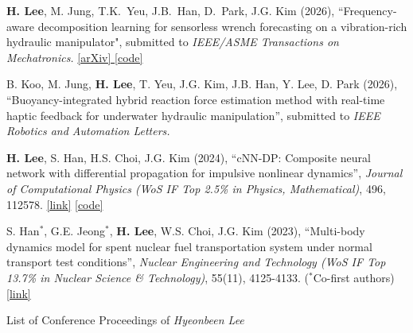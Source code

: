 \documentclass{article}
\begin{document}
\vspace*{1cm}
\begin{etaremune}[itemsep=1cm]
    \Large
    \item \textbf{H. Lee}, M. Jung, T.K.~Yeu, J.B.~Han, D.~Park, J.G. Kim (2026), ``Frequency-aware decomposition learning for sensorless wrench forecasting on a vibration-rich hydraulic manipulator", submitted to \textit{IEEE/ASME Transactions on Mechatronics.} \href{https://arxiv.org/abs/2604.12905}{[arXiv] \href{https://github.com/leehyeonbeen/FDN}{[code]}}

	\item B. Koo, M. Jung, \textbf{H. Lee}, T. Yeu, J.G. Kim, J.B. Han, Y. Lee, D. Park (2026), “Buoyancy-integrated hybrid reaction force estimation method with real-time haptic feedback for underwater hydraulic manipulation”, submitted to \textit{IEEE Robotics and Automation Letters.} %

	\item \textbf{H. Lee}, S. Han, H.S. Choi, J.G. Kim (2024), “cNN-DP: Composite neural network with differential propagation for impulsive nonlinear dynamics”, \textit{Journal of Computational Physics (WoS IF Top 2.5\% in Physics, Mathematical)}, 496, 112578. \href{https://www.sciencedirect.com/science/article/pii/S0021999123006733}{[link]} \href{https://github.com/leehyeonbeen/cNN-DP}{[code]}

	\item S. Han$^*$, G.E. Jeong$^*$, \textbf{H. Lee}, W.S. Choi, J.G. Kim (2023), “Multi-body dynamics model for spent nuclear fuel transportation system under normal transport test conditions”, \textit{Nuclear Engineering and Technology (WoS IF Top 13.7\% in Nuclear Science \& Technology)}, 55(11), 4125-4133. { ($^*$Co-first authors)} \href{https://www.sciencedirect.com/science/article/pii/S1738573323003492}{[link]}
\end{etaremune}

\pagebreak

\vspace*{0.5cm}
\begin{center}
    \huge
    List of Conference Proceedings of \textsl{Hyeonbeen Lee}
\end{center}
\end{document}
